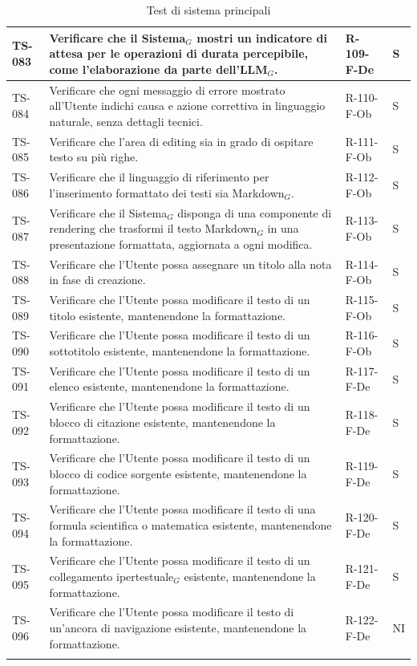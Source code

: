 \documentclass[a4paper, 10pt, colorlinks=true, linkcolor=black, urlcolor=blue, citecolor=blue, hidelinks]{article}
\begin{document}
\begin{longtable}{|p{1.4cm}|p{7.8cm}|p{2.3cm}|p{1.2cm}|}
    \hline
    TS-083 & Verificare che il Sistema$_G$ mostri un indicatore di attesa per le operazioni di durata percepibile, come l'elaborazione da parte dell'LLM$_G$. & R-109-F-De & S \\
    \hline
    TS-084 & Verificare che ogni messaggio di errore mostrato all'Utente indichi causa e azione correttiva in linguaggio naturale, senza dettagli tecnici. & R-110-F-Ob & S \\
    \hline
    TS-085 & Verificare che l'area di editing sia in grado di ospitare testo su più righe. & R-111-F-Ob & S \\
    \hline
    TS-086 & Verificare che il linguaggio di riferimento per l'inserimento formattato dei testi sia Markdown$_G$. & R-112-F-Ob & S \\
    \hline
    TS-087 & Verificare che il Sistema$_G$ disponga di una componente di rendering che trasformi il testo Markdown$_G$ in una presentazione formattata, aggiornata a ogni modifica. & R-113-F-Ob & S \\
    \hline
    TS-088 & Verificare che l'Utente possa assegnare un titolo alla nota in fase di creazione. & R-114-F-Ob & S \\
    \hline
    TS-089 & Verificare che l'Utente possa modificare il testo di un titolo esistente, mantenendone la formattazione. & R-115-F-Ob & S \\
    \hline
    TS-090 & Verificare che l'Utente possa modificare il testo di un sottotitolo esistente, mantenendone la formattazione. & R-116-F-Ob & S \\
    \hline
    TS-091 & Verificare che l'Utente possa modificare il testo di un elenco esistente, mantenendone la formattazione. & R-117-F-De & S \\
    \hline
    TS-092 & Verificare che l'Utente possa modificare il testo di un blocco di citazione esistente, mantenendone la formattazione. & R-118-F-De & S \\
    \hline
    TS-093 & Verificare che l'Utente possa modificare il testo di un blocco di codice sorgente esistente, mantenendone la formattazione. & R-119-F-De & S \\
    \hline
    TS-094 & Verificare che l'Utente possa modificare il testo di una formula scientifica o matematica esistente, mantenendone la formattazione. & R-120-F-De & S \\
    \hline
    TS-095 & Verificare che l'Utente possa modificare il testo di un collegamento ipertestuale$_G$ esistente, mantenendone la formattazione. & R-121-F-De & S \\
    \hline
    TS-096 & Verificare che l'Utente possa modificare il testo di un'ancora di navigazione esistente, mantenendone la formattazione. & R-122-F-De & NI \\
    \hline
   \caption{Test di sistema principali} 
\end{longtable}
\end{document}
